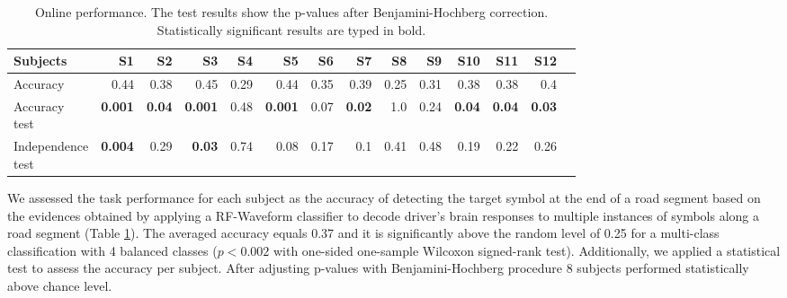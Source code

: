 \documentclass[12pt]{iopart}
\begin{document}
\begin{table}
    \centering
    \caption{Online performance. The test results show the p-values after Benjamini-Hochberg correction.
    Statistically significant results are typed in bold.}
    \scriptsize
    \renewcommand{\arraystretch}{1.5}
    \begin{tabular}{l r r r r r r r r r r r r r}
        \hline
        Subjects & S1 & S2 & S3 & S4 & S5 & S6 & S7 & S8 & S9 & S10 & S11 & S12 \\
        \hline

        Accuracy & 0.44 & 0.38 & 0.45 & 0.29 & 0.44 & 0.35 & 0.39 & 0.25 & 0.31 & 0.38 & 0.38 & 0.4 \\ 
        \shortstack{Accuracy \\ test} & \textbf{0.001} & \textbf{0.04} & \textbf{0.001}
        & 0.48 & \textbf{0.001} & 0.07 & \textbf{0.02} & 1.0 & 0.24 & \textbf{0.04} & \textbf{0.04} & \textbf{0.03} \\
        \shortstack{Independence \\ test}  & \textbf{0.004} & 0.29 & \textbf{0.03} & 0.74
        & 0.08 & 0.17 & 0.1 & 0.41 & 0.48 & 0.19 & 0.22 & 0.26 \\
        \hline
    \end{tabular}
    \label{tab:onlineperf}
\end{table}

We assessed the task performance for each subject as the accuracy of
detecting the target symbol at the end of a road segment based on the evidences obtained by applying a RF-Waveform classifier
to decode driver’s brain responses to multiple instances of symbols along a road segment (Table \ref{tab:onlineperf}).
The averaged accuracy 
equals 0.37 and it is significantly above the random level of 0.25 for
a multi-class classification with 4 balanced classes ($p < 0.002$ with one-sided one-sample Wilcoxon signed-rank test).
Additionally, we applied a statistical test to assess the accuracy per subject.
After adjusting p-values with Benjamini-Hochberg procedure 8 subjects performed statistically above chance level.
\end{document}
